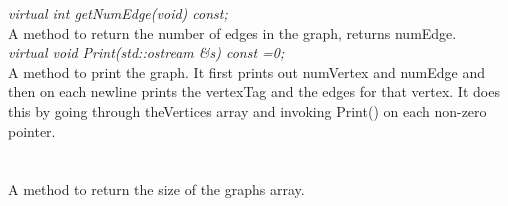{\em virtual int getNumEdge(void) const;} \\
A method to return the number of edges in the graph, returns numEdge. \\


{\em virtual void Print(std::ostream \&s) const =0;} \\
A method to print the graph. It first prints out numVertex and numEdge
and then on each newline prints the vertexTag and the edges for that
vertex. It does this by going through theVertices array and invoking
Print()  on each non-zero pointer.\\

  \\
 \\
A method to return the size of the graphs array. \\





